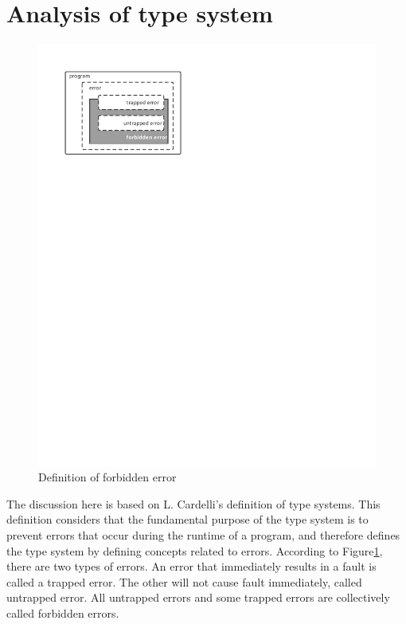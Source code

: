 \section{Analysis of type system}

\begin{figure}[htbp]
    \centerline{\includegraphics[scale=0.8]{figures/type-definition}}
    \caption{Definition of forbidden error}
    \label{fig:type-definition}
\end{figure}

The discussion here is based on L. Cardelli's definition of type systems\cite{cardelli1996type}.
This definition considers that the fundamental purpose of
the type system is to prevent errors that occur during the
runtime of a program, and therefore defines the type system by defining
concepts related to errors.
According to Figure\ref{fig:type-definition}, there are two types of errors.
An error that immediately results in a fault is called a trapped error.
The other will not cause fault immediately, called untrapped error.
All untrapped errors and some trapped errors are collectively
called forbidden errors.

